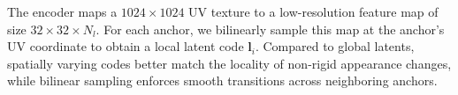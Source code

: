 \documentclass[runningheads]{llncs}
\newcommand{\vect}[1]{\boldsymbol{\mathbf{#1}}}
\begin{document}
The encoder maps a $1024{\times}1024$ UV texture to a low-resolution feature map of size $32{\times}32{\times}N_l$.
For each anchor, we bilinearly sample this map at the anchor's UV coordinate to obtain a local latent code $\vect{l}_i$.
Compared to global latents, spatially varying codes better match the locality of non-rigid appearance changes, while bilinear sampling enforces smooth transitions across neighboring anchors.



\end{document}
